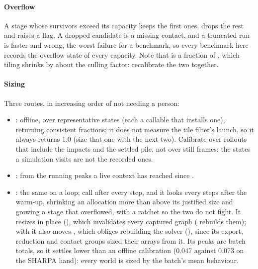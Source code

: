\paragraph{Overflow} A stage whose survivors exceed its capacity keeps the first ones, drops the rest and raises a flag. A dropped candidate is a missing contact, and a truncated run is faster and wrong, the worst failure for a benchmark, so every benchmark here records the overflow state of every capacity. Note that  is a fraction of , which tiling shrinks by about the culling factor: recalibrate the two together.

\paragraph{Sizing} Three routes, in increasing order of not needing a person:
\begin{itemize}
\item {}: offline, over representative states (each a callable that installs one), returning consistent fractions; it does not measure the tile filter's launch, so it always returns  1.0 (size that one with the next two). Calibrate over rollouts that include the impacts and the settled pile, not over still frames: the states a simulation visits are not the recorded ones.
\item {}: from the running peaks  a live context has reached since .
\item {}: the same on a loop; call  after every step, and it looks every  steps after the warm-up, shrinking an allocation more than  above its justified size and growing a stage that overflowed, with a ratchet so the two do not fight. It resizes in place (), which invalidates every captured graph ( rebuilds them); with  it also moves , which obliges rebuilding the solver (), since its export, reduction and contact groups sized their arrays from it. Its peaks are batch totals, so it settles lower than an offline calibration (0.047 against 0.073 on the SHARPA hand): every world is sized by the batch's mean behaviour.
\end{itemize}
